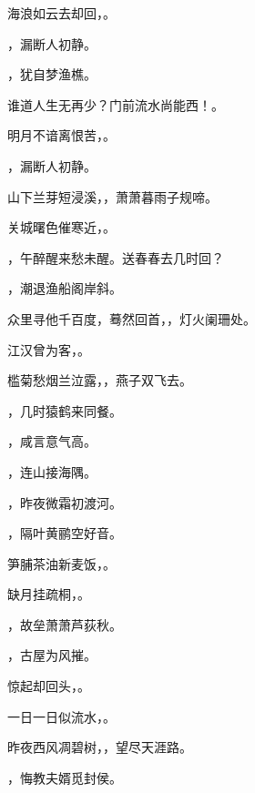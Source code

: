 \documentclass[12pt, a4paper, addpoints]{exam}
\begin{document}
\begin{questions}
\question[1] 海浪如云去却回，\uline{\qquad\qquad\qquad}。

\question[1] \uline{\qquad\qquad\qquad}，漏断人初静。

\question[1] \uline{\qquad\qquad\qquad}，犹自梦渔樵。

\question[1] 谁道人生无再少？门前流水尚能西！\uline{\qquad\qquad\qquad}。

\question[1] 明月不谙离恨苦，\uline{\qquad\qquad\qquad}。

\question[1] \uline{\qquad\qquad\qquad}，漏断人初静。

\question[1] 山下兰芽短浸溪，\uline{\qquad\qquad\qquad}，萧萧暮雨子规啼。

\question[1] 关城曙色催寒近，\uline{\qquad\qquad\qquad}。

\question[1] \uline{\qquad\qquad\qquad}，午醉醒来愁未醒。送春春去几时回？

\question[1] \uline{\qquad\qquad\qquad}，潮退渔船阁岸斜。

\question[1] 众里寻他千百度，蓦然回首，\uline{\qquad\qquad\qquad}，灯火阑珊处。

\question[1] 江汉曾为客，\uline{\qquad\qquad\qquad}。

\question[1] 槛菊愁烟兰泣露，\uline{\qquad\qquad\qquad}，燕子双飞去。

\question[1] \uline{\qquad\qquad\qquad}，几时猿鹤来同餐。

\question[1] \uline{\qquad\qquad\qquad}，咸言意气高。

\question[1] \uline{\qquad\qquad\qquad}，连山接海隅。

\question[1] \uline{\qquad\qquad\qquad}，昨夜微霜初渡河。

\question[1] \uline{\qquad\qquad\qquad}，隔叶黄鹂空好音。

\question[1] 笋脯茶油新麦饭，\uline{\qquad\qquad\qquad}。

\question[1] 缺月挂疏桐，\uline{\qquad\qquad\qquad}。

\question[1] \uline{\qquad\qquad\qquad}，故垒萧萧芦荻秋。

\question[1] \uline{\qquad\qquad\qquad}，古屋为风摧。

\question[1] 惊起却回头，\uline{\qquad\qquad\qquad}。

\question[1] 一日一日似流水，\uline{\qquad\qquad\qquad}。

\question[1] 昨夜西风凋碧树，\uline{\qquad\qquad\qquad}，望尽天涯路。

\question[1] \uline{\qquad\qquad\qquad}，悔教夫婿觅封侯。


\end{questions}
\end{document}

